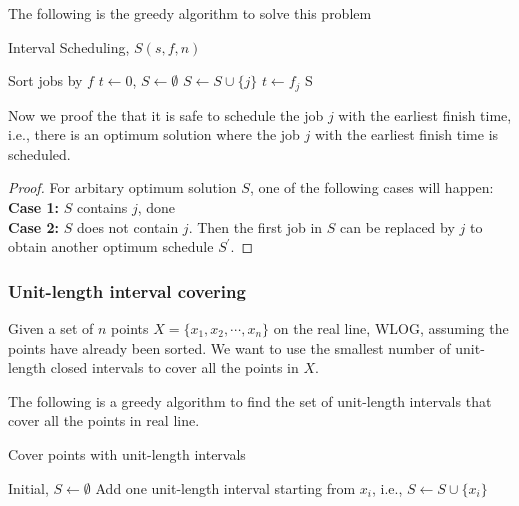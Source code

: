 						The following is the greedy algorithm to solve this problem
						\begin{algorithm}[!ht]
							\caption{Interval Scheduling, $S(s, f, n)$}
							\begin{algorithmic}[1]
								\State Sort jobs by $f$
								\State $t \gets 0$, $S\gets \emptyset$
										\State $S \gets S \cup \{j\}$
										\State $t \gets f_j$
									\EndIf
								\EndFor
								\Return S
							\end{algorithmic}
						\end{algorithm}

						Now we proof the that it is safe to schedule the job $j$ with the earliest finish time, i.e., there is an optimum solution where the job $j$ with the earliest finish time is scheduled.

						\begin{proof}
							For arbitary optimum solution $S$, one of the following cases will happen:\\
							\textbf{Case 1: } $S$ contains $j$, done\\
							\textbf{Case 2: } $S$ does not contain $j$. Then the first job in $S$ can be replaced by $j$ to obtain another optimum schedule $S^\prime$.
						\end{proof}

					\subsubsection{Unit-length interval covering}
						Given a set of $n$ points $X = \{x_1, x_2, \cdots, x_n\}$ on the real line, WLOG, assuming the points have already been sorted. We want to use the smallest number of unit-length closed intervals to cover all the points in $X$. 

						The following is a greedy algorithm to find the set of unit-length intervals that cover all the points in real line.
						\begin{algorithm}[!ht]
							\caption{Cover points with unit-length intervals}
							\begin{algorithmic}[1]
								\State Initial, $S \gets \emptyset$
										\State Add one unit-length interval starting from $x_i$, i.e., $S \gets S \cup \{x_i\}$
									\EndIf
								\EndFor
							\end{algorithmic}
						\end{algorithm}

